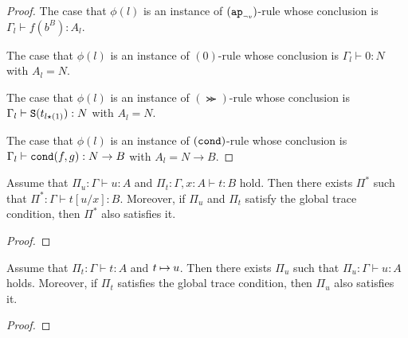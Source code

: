 \begin{proof}
  
  The case that $\phi(l)$ is an instance of $({{\tt ap}_{\mbox{\tiny $\neg v$}}})$-rule
  whose conclusion is $\Gamma_l\vdash f(b^B):A_l$. 

  The case that $\phi(l)$ is an instance of $(0)$-rule
  whose conclusion is $\Gamma_l\vdash 0:N$ with $A_l=N$. 

  The case that $\phi(l)$ is an instance of $(\Succ)$-rule
  whose conclusion is $\Gamma_l\vdash {\tt S}(t_{l{\star}(1)}):N$ with $A_l=N$.


  The case that $\phi(l)$ is an instance of $({\tt cond})$-rule
  whose conclusion is $\Gamma_l\vdash {\tt cond}(f,g):N\to B$ with $A_l=N\to B$.

  
\end{proof}



\begin{lemma}
  Assume that $\Pi_u: \Gamma \vdash u:A$ and $\Pi_t:\Gamma,x:A \vdash t:B$ hold.
  Then there exists $\Pi^*$ such that $\Pi^*:\Gamma \vdash t[u/x]:B$. 
  Moreover, if $\Pi_u$ and $\Pi_t$ satisfy the global trace condition,
  then $\Pi^*$ also satisfies it. 
\end{lemma}
\begin{proof}


\end{proof}


\begin{theorem}
  Assume that $\Pi_t:\Gamma\vdash t:A$ and $t\mathbin{\mapsto} u$.
  Then there exists $\Pi_u$ such that $\Pi_u:\Gamma\vdash u:A$ holds. 
  Moreover, if $\Pi_t$ satisfies the global trace condition,
  then $\Pi_u$ also satisfies it. 
\end{theorem}
\begin{proof}


\end{proof}
